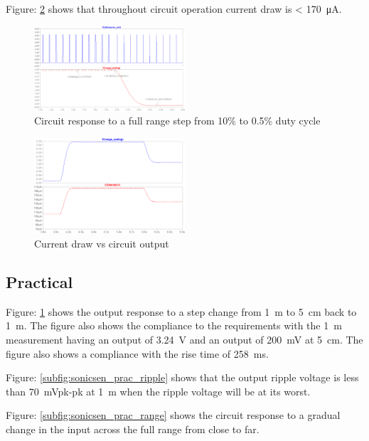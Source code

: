 Figure: \ref{fig:sonicsen_sim_cur} shows that throughout circuit operation current draw is < \SI{170}{\micro\ampere}.

\begin{figure}[H]
\centering
\includegraphics[width = 0.5\textwidth]{./Figures/SonicSens_RangeStep.png}
\caption{Circuit response to a full range step from 10\% to 0.5\% duty cycle}
\label{fig:sonicsen_sim_step}
\end{figure}

\begin{figure}[H]
\centering
\includegraphics[width = 0.5\textwidth]{./Figures/SonicSens_CurDraw.png}
\caption{Current draw vs circuit output}
\label{fig:sonicsen_sim_cur}
\end{figure}

\clearpage
\subsection{Practical}

Figure: \ref{fig:sonicsen_sim_step} shows the output response to a step change from \SI{1}{\meter} to \SI{5}{\centi\meter} back to \SI{1}{\meter}. The figure also shows the compliance to the requirements with the \SI{1}{\meter} measurement having an output of \SI{3.24}{\volt} and an output of \SI{200}{\milli\volt} at \SI{5}{\centi\meter}. The figure also shows a compliance with the rise time of \SI{258}{\milli\second}.

Figure: \ref{subfig:sonicsen_prac_ripple} shows that the output ripple voltage is less than \SI{70}{\milli\volt}pk-pk at \SI{1}{\meter} when the ripple voltage will be at its worst.

Figure: \ref{subfig:sonicsen_prac_range} shows the circuit response to a gradual change in the input across the full range from close to far.

